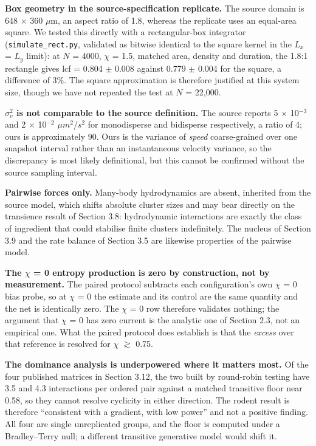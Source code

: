 \documentclass[aps,pre,preprint,superscriptaddress,nofootinbib,longbibliography]{revtex4-2}
\begin{document}
\textbf{Box geometry in the source-specification replicate.} The source domain is 648 $\times$ 360 $\mu$m, an aspect ratio of 1.8, whereas the replicate uses an equal-area square. We tested this directly with a rectangular-box integrator (\texttt{simulate\_rect.py}, validated as bitwise identical to the square kernel in the $L_x$ = $L_y$ limit): at $N$ = 4000, $\chi$ = 1.5, matched area, density and duration, the 1.8:1 rectangle gives lcf = 0.804 $\pm$ 0.008 against 0.779 $\pm$ 0.004 for the square, a difference of 3\%. The square approximation is therefore justified at this system size, though we have not repeated the test at $N$ = 22,000.

\textbf{$\sigma^2_v$ is not comparable to the source definition.} The source reports 5 $\times$ 10$^{-3}$ and 2 $\times$ 10$^{-2}$ $\mu m^{2}$/$s^{2}$ for monodisperse and bidisperse respectively, a ratio of 4; ours is approximately 90. Ours is the variance of \emph{speed} coarse-grained over one snapshot interval rather than an instantaneous velocity variance, so the discrepancy is most likely definitional, but this cannot be confirmed without the source sampling interval.

\textbf{Pairwise forces only.} Many-body hydrodynamics are absent, inherited from the source model, which shifts absolute cluster sizes and may bear directly on the transience result of Section 3.8: hydrodynamic interactions are exactly the class of ingredient that could stabilise finite clusters indefinitely. The nucleus of Section 3.9 and the rate balance of Section 3.5 are likewise properties of the pairwise model.

\textbf{The $\chi$ = 0 entropy production is zero by construction, not by measurement.} The paired protocol subtracts each configuration's own $\chi$ = 0 bias probe, so at $\chi$ = 0 the estimate and its control are the same quantity and the net is identically zero. The $\chi$ = 0 row therefore validates nothing; the argument that $\chi$ = 0 has zero current is the analytic one of Section 2.3, not an empirical one. What the paired protocol does establish is that the \emph{excess} over that reference is resolved for $\chi$ $\gtrsim$ 0.75.

\textbf{The dominance analysis is underpowered where it matters most.} Of the four published matrices in Section 3.12, the two built by round-robin testing have 3.5 and 4.3 interactions per ordered pair against a matched transitive floor near 0.58, so they cannot resolve cyclicity in either direction. The rodent result is therefore ``consistent with a gradient, with low power'' and not a positive finding. All four are single unreplicated groups, and the floor is computed under a Bradley--Terry null; a different transitive generative model would shift it.
\end{document}
